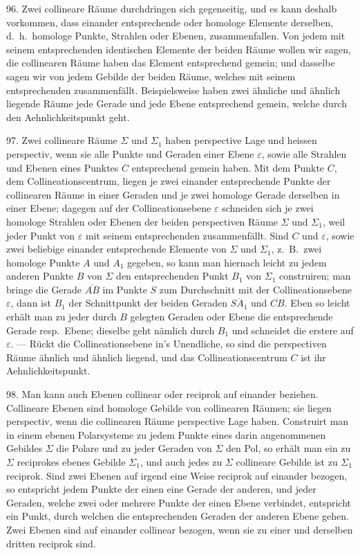 96. Zwei collineare R\"aume durchdringen sich gegenseitig,
und es kann deshalb vorkommen, dass einander entsprechende
oder {\glqq}homologe{\grqq} Elemente derselben, d.~h.\ homologe
Punkte, Strahlen oder Ebenen, zusammenfallen. Von
jedem mit seinem entsprechenden identischen Elemente der
beiden R\"aume wollen wir sagen, die collinearen R\"aume haben
das Element {\glqq}entsprechend gemein{\grqq}; und dasselbe sagen wir
von jedem Gebilde der beiden R\"aume, welches mit seinem
entsprechenden zusammenf\"allt. Beispielsweise haben zwei
\"ahnliche und \"ahnlich liegende R\"aume jede Gerade und jede
Ebene entsprechend gemein, welche durch den Aehnlichkeitspunkt
geht.

97. Zwei collineare R\"aume $\varSigma$ und $\varSigma_1$ haben {\glqq}perspective
Lage{\grqq} und heissen {\glqq}perspectiv{\grqq}, wenn sie alle
Punkte und Geraden einer Ebene $\varepsilon$, sowie alle Strahlen und
Ebenen eines Punktes $C$ entsprechend gemein haben. Mit
dem Punkte $C$, dem {\glqq}Collineationscentrum{\grqq}, liegen je zwei
einander entsprechende Punkte der collinearen R\"aume in
einer Geraden und je zwei homologe Gerade derselben in
einer Ebene; dagegen auf der {\glqq}Collineationsebene{\grqq} $\varepsilon$ schneiden
sich je zwei homologe Strahlen oder Ebenen der beiden
perspectiven R\"aume $\varSigma$ und $\varSigma_1$, weil jeder Punkt von $\varepsilon$
mit seinem entsprechenden zusammenf\"allt. Sind $C$ und $\varepsilon$,
sowie zwei beliebige einander entsprechende Elemente von
$\varSigma$ und $\varSigma_1$, z.~B.\ zwei homologe Punkte $A$ und $A_1$ gegeben,
so kann man hiernach leicht zu jedem anderen Punkte $B$
von $\varSigma$ den entsprechenden Punkt $B_1$ von $\varSigma_1$ construiren;
man bringe die Gerade $\overline{AB}$ im Punkte $S$ zum Durchschnitt
mit der Collineationsebene $\varepsilon$, dann ist $B_1$ der Schnittpunkt
der beiden Geraden $\overline{SA_1}$ und $\overline{CB}$. Eben so leicht erh\"alt man
zu jeder durch $B$ gelegten Geraden oder Ebene die entsprechende
Gerade resp.\ Ebene; dieselbe geht n\"amlich durch
$B_1$ und schneidet die erstere auf $\varepsilon$. --- R\"uckt die Collineationsebene
in's Unendliche, so sind die perspectiven R\"aume
\"ahnlich und \"ahnlich liegend, und das Collineationscentrum
$C$ ist ihr Aehnlichkeitspunkt.

98. Man kann auch Ebenen collinear oder reciprok auf
einander beziehen. Collineare Ebenen sind homologe Gebilde
von collinearen R\"aumen; sie liegen perspectiv, wenn die
collinearen R\"aume perspective Lage haben. Construirt
man in einem ebenen Polarsysteme zu jedem Punkte eines
darin angenommenen Gebildes $\varSigma$ die Polare und zu jeder
Geraden von $\varSigma$ den Pol, so erh\"alt man ein zu $\varSigma$ reciprokes
ebenes Gebilde $\varSigma_1$, und auch jedes zu $\varSigma$ collineare Gebilde
ist zu $\varSigma_1$ reciprok. Sind zwei Ebenen auf irgend eine Weise
reciprok auf einander bezogen, so entspricht jedem Punkte
der einen eine Gerade der anderen, und jeder Geraden, welche
zwei oder mehrere Punkte der einen Ebene verbindet, entspricht
ein Punkt, durch welchen die entsprechenden Geraden
der anderen Ebene gehen. Zwei Ebenen sind auf einander
collinear bezogen, wenn sie zu einer und derselben dritten
reciprok sind.

